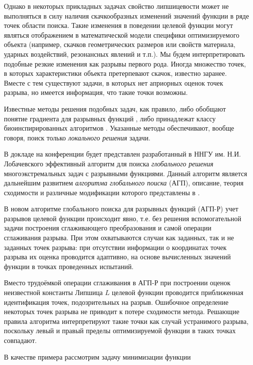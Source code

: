 \documentclass[11pt, oneside, a4paper]{article}
\begin{document}
Однако в некоторых прикладных задачах свойство липшицевости может не выполняться в силу наличия скачкообразных изменений значений функции в ряде точек области поиска. Такие изменения в поведении целевой функции могут являться отображением в математической модели специфики оптимизируемого объекта (например, скачков геометрических размеров или свойств материала, ударных воздействий, резонансных явлений и т.п.). Мы будем интерпретировать подобные резкие изменения как разрывы первого рода. Иногда множество точек, в которых характеристики объекта претерпевают скачок, известно заранее. Вместе с тем существуют задачи, в которых нет априорных оценок точек разрыва, но имеется информация, что такие точки возможны.

Известные методы решения подобных задач, как правило, либо обобщают понятие градиента для разрывных функций \cite{Batuhtin1997}, либо принадлежат классу биоинспирированных алгоритмов \cite{Jihui}. Указанные методы обеспечивают, вообще говоря, поиск только \textit{локального решения} задачи. 

В докладе на конференции будет представлен разработанный в ННГУ им. Н.И. Лобачевского эффективный алгоритм для поиска \textit{глобального решения} многоэкстремальных задач с разрывными функциями. 
Данный алгоритм является дальнейшим развитием \textit{алгоритма глобального поиска} (АГП), описание, теория сходимости и различные модификации которого представлены в \cite{Strongin2013}. 

В новом алгоритме глобального поиска для разрывных функций (АГП-Р) учет разрывов целевой функции происходит явно, т.е. без решения вспомогательной задачи построения сглаживающего преобразования и самой операции сглаживания разрыва. При этом охватываются случаи как заданных, так и не заданных точек разрыва: при отсутствии информации о координатах точек разрыва их оценка проводится адаптивно, на основе вычисленных значений функции в точках проведенных испытаний.

Вместо трудоёмкой операции сглаживания в АГП-Р при построении оценок неизвестной константы Липшица $L$ целевой функции проводится приближенная идентификация точек, подозрительных на разрыв. Ошибочное определение некоторых точек разрыва не приводит к потере сходимости метода. Решающие правила алгоритма интерпретируют такие точки как случай устранимого разрыва, поскольку левый и правый пределы оптимизируемой функции в таких точках совпадают.


В качестве примера рассмотрим задачу минимизации функции
\end{document}

